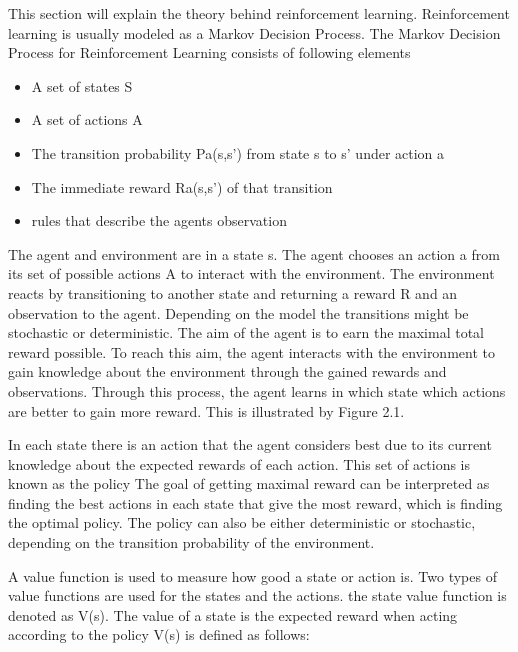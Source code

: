 \vspace{1cm}

This section will explain the theory behind reinforcement learning. Reinforcement learning is usually modeled as a Markov Decision Process. The Markov Decision Process for Reinforcement Learning consists of following elements %

\begin{itemize}
	\item A set of states S
	\item A set of actions A
	\item The transition probability Pa(s,s') from state s to s' under action a
	\item The immediate reward Ra(s,s') of that transition
	\item rules that describe the agents observation
\end{itemize}

The agent and environment are in a state s. The agent chooses an action a from its set of possible actions A to interact with the environment. The environment reacts by transitioning to another state and returning a reward R and an observation to the agent. Depending on the model the transitions might be stochastic or deterministic. The aim of the agent is to earn the maximal total reward possible. To reach this aim, the agent interacts with the environment to gain knowledge about the environment through the gained rewards and observations. Through this process, the agent learns in which state which actions are better to gain more reward. This is illustrated by Figure 2.1.


In each state there is an action that the agent considers best due to its current knowledge about the expected rewards of each action. This set of actions is known as the policy 
The goal of getting maximal reward can be interpreted as finding the best actions in each state that give the most reward, which is finding the optimal policy. The policy can also be either deterministic or stochastic, depending on the transition probability of the environment.

\vspace{1cm}

A value function is used to measure how good a state or action is. Two types of value functions are used for the states and the actions. the state value function is denoted as V(s). The value of a state is the expected reward when acting according to the policy 
V(s) is defined as follows:

